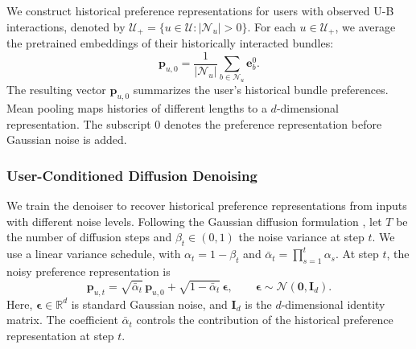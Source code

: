 \documentclass[letterpaper]{article}
\begin{document}
We construct historical preference representations for users with observed U-B interactions, denoted by $\mathcal U_+=\{u\in\mathcal U:|\mathcal N_u|>0\}$. For each $u\in\mathcal U_+$, we average the pretrained embeddings of their historically interacted bundles:
\begin{equation}
\mathbf p_{u,0}
=\frac{1}{|\mathcal N_u|}
\sum_{b\in\mathcal N_u}\mathbf e_b^0.
\tag{3}
\end{equation}
The resulting vector $\mathbf p_{u,0}$ summarizes the user's historical bundle preferences. Mean pooling maps histories of different lengths to a $d$-dimensional representation. The subscript $0$ denotes the preference representation before Gaussian noise is added.

\subsubsection{User-Conditioned Diffusion Denoising}

We train the denoiser to recover historical preference representations from inputs with different noise levels. Following the Gaussian diffusion formulation \cite{ho2020ddpm,wang2023diffrec}, let $T$ be the number of diffusion steps and $\beta_t\in(0,1)$ the noise variance at step $t$. We use a linear variance schedule, with $\alpha_t=1-\beta_t$ and $\bar\alpha_t=\prod_{s=1}^{t}\alpha_s$. At step $t$, the noisy preference representation is
\begin{equation}
\mathbf p_{u,t}
=\sqrt{\bar\alpha_t}\,\mathbf p_{u,0}
+\sqrt{1-\bar\alpha_t}\,\boldsymbol\epsilon,
\qquad
\boldsymbol\epsilon\sim\mathcal N(\mathbf 0,\mathbf I_d).
\tag{4}
\end{equation}
Here, $\boldsymbol\epsilon\in\mathbb R^d$ is standard Gaussian noise, and $\mathbf I_d$ is the $d$-dimensional identity matrix. The coefficient $\bar\alpha_t$ controls the contribution of the historical preference representation at step $t$.
\end{document}
